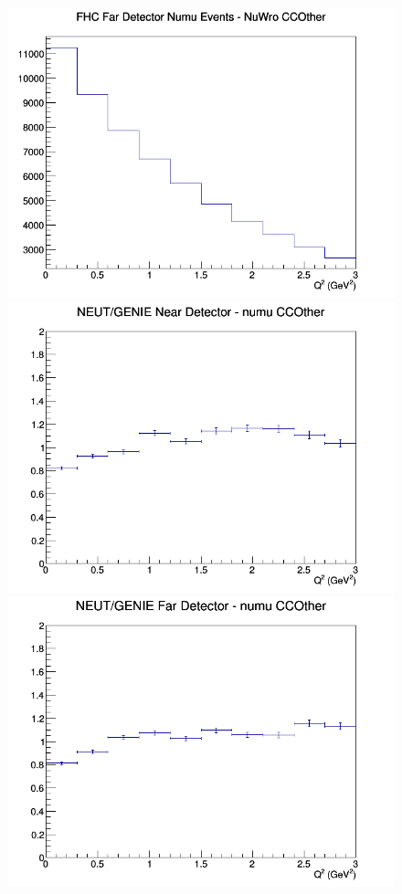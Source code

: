 \begin{figure}[h]
\endminipage
{}
\includegraphics[width=\linewidth]{eff_Q2/GAr/CCOther_FHC_FD_numu_Q2_NuWro.png}
\endminipage
\newline
{}
\includegraphics[width=\linewidth]{eff_Q2/GAr/ratios/CCOther_NEUT_GENIE_numu_near_Q2.png}
\endminipage
{}
\includegraphics[width=\linewidth]{eff_Q2/GAr/ratios/CCOther_NEUT_GENIE_numu_far_Q2.png}

\end{figure}
